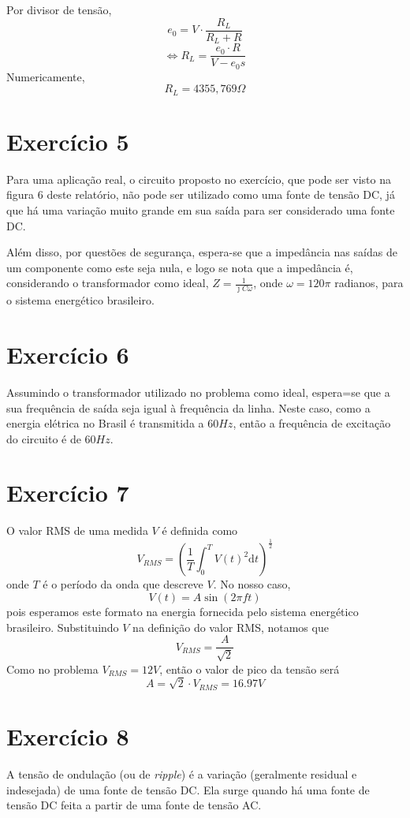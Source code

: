 \documentclass[12pt, a4paper, twoside]{article}
\begin{document}
Por divisor de tensão,
$$ e_0 = V \cdot \frac{R_L}{R_L+R} $$
$$ \Leftrightarrow R_L = \frac{e_0 \cdot R}{V-e_0s} $$
Numericamente,
$$ R_L = 4355,769 \Omega $$

\section{Exercício 5}

Para uma aplicação real, o circuito proposto no exercício, que pode ser visto na figura 6 deste relatório, não pode ser utilizado como uma fonte de tensão DC, já que há uma variação muito grande em sua saída para ser considerado uma fonte DC.

Além disso, por questões de segurança, espera-se que a impedância nas saídas de um componente como este seja nula, e logo se nota que a impedância é, considerando o transformador como ideal, $Z = \frac{1}{\jmath C \omega}$, onde $\omega = 120 \pi$ radianos, para o sistema energético brasileiro.

\section{Exercício 6}

Assumindo o transformador utilizado no problema como ideal, espera=se que a sua frequência de saída seja igual à frequência da linha. Neste caso, como a energia elétrica no Brasil é transmitida a $60Hz$, então a frequência de excitação do circuito é de $60Hz$.

\section{Exercício 7}

O valor RMS de uma medida $V$ é definida como
$$ V_{RMS} = \left( \frac{1}{T} \int_0^T V(t)^2 \mathrm{d}t \right)^{\frac{1}{2}} $$
onde $T$ é o período da onda que descreve $V$. No nosso caso,
$$ V(t) = A \sin(2 \pi f t) $$
pois esperamos este formato na energia fornecida pelo sistema energético brasileiro. Substituindo $V$ na definição do valor RMS, notamos que
$$ V_{RMS} = \frac{A}{\sqrt{2}} $$
Como no problema $V_{RMS} = 12V$, então o valor de pico da tensão será
$$ A = \sqrt{2} \cdot V_{RMS} = 16.97V $$

\section{Exercício 8}

A tensão de ondulação (ou de \textit{ripple}) é a variação (geralmente residual e indesejada) de uma fonte de tensão DC. Ela surge quando há uma fonte de tensão DC feita a partir de uma fonte de tensão AC.
\end{document}
